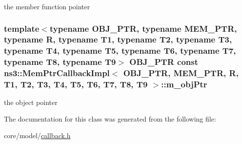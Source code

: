 the member function pointer 

\subsubsection[{\texorpdfstring{m\+\_\+obj\+Ptr}{m_objPtr}}]{\setlength{\rightskip}{0pt plus 5cm}template$<$typename O\+B\+J\+\_\+\+P\+TR, typename M\+E\+M\+\_\+\+P\+TR, typename R, typename T1, typename T2, typename T3, typename T4, typename T5, typename T6, typename T7, typename T8, typename T9$>$ O\+B\+J\+\_\+\+P\+TR const {\bf ns3\+::\+Mem\+Ptr\+Callback\+Impl}$<$ O\+B\+J\+\_\+\+P\+TR, M\+E\+M\+\_\+\+P\+TR, R, T1, T2, T3, T4, T5, T6, T7, T8, T9 $>$\+::m\+\_\+obj\+Ptr\hspace{0.3cm}{\ttfamily [private]}}\hypertarget{classns3_1_1MemPtrCallbackImpl_a9df02a22837d1625d53331ae0924f89c}{}\label{classns3_1_1MemPtrCallbackImpl_a9df02a22837d1625d53331ae0924f89c}


the object pointer 



The documentation for this class was generated from the following file\+:\begin{DoxyCompactItemize}
\item 
core/model/\hyperlink{callback_8h}{callback.\+h}\end{DoxyCompactItemize}
